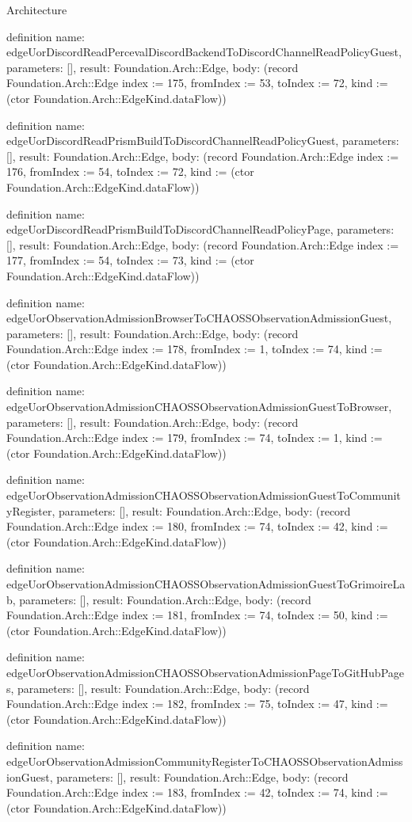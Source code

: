\begin{lexlean}{Architecture}
\begin{semanticmodule}
definition{
  name: edgeUorDiscordReadPercevalDiscordBackendToDiscordChannelReadPolicyGuest,
  parameters: [],
  result: Foundation.Arch::Edge,
  body: (record Foundation.Arch::Edge {index := 175, fromIndex := 53, toIndex := 72, kind := (ctor Foundation.Arch::EdgeKind.dataFlow)})
}

definition{
  name: edgeUorDiscordReadPrismBuildToDiscordChannelReadPolicyGuest,
  parameters: [],
  result: Foundation.Arch::Edge,
  body: (record Foundation.Arch::Edge {index := 176, fromIndex := 54, toIndex := 72, kind := (ctor Foundation.Arch::EdgeKind.dataFlow)})
}

definition{
  name: edgeUorDiscordReadPrismBuildToDiscordChannelReadPolicyPage,
  parameters: [],
  result: Foundation.Arch::Edge,
  body: (record Foundation.Arch::Edge {index := 177, fromIndex := 54, toIndex := 73, kind := (ctor Foundation.Arch::EdgeKind.dataFlow)})
}

definition{
  name: edgeUorObservationAdmissionBrowserToCHAOSSObservationAdmissionGuest,
  parameters: [],
  result: Foundation.Arch::Edge,
  body: (record Foundation.Arch::Edge {index := 178, fromIndex := 1, toIndex := 74, kind := (ctor Foundation.Arch::EdgeKind.dataFlow)})
}

definition{
  name: edgeUorObservationAdmissionCHAOSSObservationAdmissionGuestToBrowser,
  parameters: [],
  result: Foundation.Arch::Edge,
  body: (record Foundation.Arch::Edge {index := 179, fromIndex := 74, toIndex := 1, kind := (ctor Foundation.Arch::EdgeKind.dataFlow)})
}

definition{
  name: edgeUorObservationAdmissionCHAOSSObservationAdmissionGuestToCommunityRegister,
  parameters: [],
  result: Foundation.Arch::Edge,
  body: (record Foundation.Arch::Edge {index := 180, fromIndex := 74, toIndex := 42, kind := (ctor Foundation.Arch::EdgeKind.dataFlow)})
}

definition{
  name: edgeUorObservationAdmissionCHAOSSObservationAdmissionGuestToGrimoireLab,
  parameters: [],
  result: Foundation.Arch::Edge,
  body: (record Foundation.Arch::Edge {index := 181, fromIndex := 74, toIndex := 50, kind := (ctor Foundation.Arch::EdgeKind.dataFlow)})
}

definition{
  name: edgeUorObservationAdmissionCHAOSSObservationAdmissionPageToGitHubPages,
  parameters: [],
  result: Foundation.Arch::Edge,
  body: (record Foundation.Arch::Edge {index := 182, fromIndex := 75, toIndex := 47, kind := (ctor Foundation.Arch::EdgeKind.dataFlow)})
}

definition{
  name: edgeUorObservationAdmissionCommunityRegisterToCHAOSSObservationAdmissionGuest,
  parameters: [],
  result: Foundation.Arch::Edge,
  body: (record Foundation.Arch::Edge {index := 183, fromIndex := 42, toIndex := 74, kind := (ctor Foundation.Arch::EdgeKind.dataFlow)})
}


\end{semanticmodule}
\end{lexlean}
